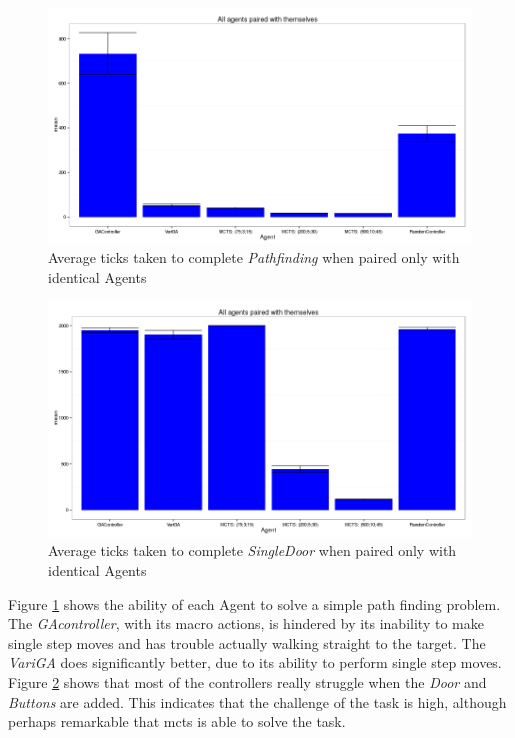 \documentclass{IEEEtran}
\begin{document}
\begin{figure}[!ht]
\centering
\includegraphics[width=\linewidth]{level1E-txt-pairs-ticks}
\caption{Average ticks taken to complete \emph{Pathfinding} when paired only with identical Agents}
\label{1epairedTicks}
\end{figure}

\begin{figure}[!ht]
\centering
\includegraphics[width=\linewidth]{level1-txt-pairs-ticks}
\caption{Average ticks taken to complete \emph{SingleDoor} when paired only with identical Agents}
\label{1pairedTicks}
\end{figure}

Figure \ref{1epairedTicks} shows the ability of each Agent to solve a simple path finding problem. The \emph{GAcontroller}, with its macro actions, is hindered by its inability to make single step moves and has trouble actually walking straight to the target. The \emph{VariGA} does significantly better, due to its ability to perform single step moves. Figure \ref{1pairedTicks} shows that most of the controllers really struggle when the \emph{Door} and \emph{Buttons} are added. This indicates that the challenge of the task is high, although perhaps remarkable that \gls{mcts} is able to solve the task.
\end{document}
